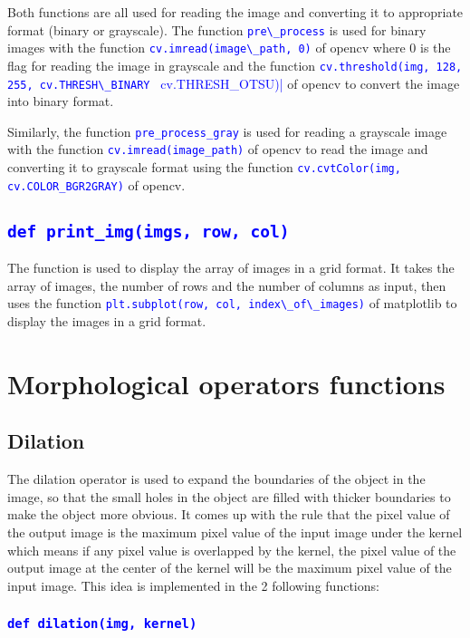 \documentclass{report}
\begin{document}
Both functions are all used for reading the image and converting it to appropriate format (binary or grayscale). The function \textcolor{blue}{\lstinline|pre\_process|} is used for binary images with the function \textcolor{blue}{\lstinline|cv.imread(image\_path, 0)|} of opencv where 0 is the flag for reading the image in grayscale and the function \textcolor{blue}{\lstinline|cv.threshold(img, 128, 255, cv.THRESH\_BINARY | cv.THRESH\_OTSU)|} of opencv to convert the image into binary format.

Similarly, the function \textcolor{blue}{\lstinline|pre_process_gray|} is used for reading a grayscale image with the function \textcolor{blue}{\lstinline|cv.imread(image_path)|} of opencv to read the image and converting it to grayscale format using the function \textcolor{blue}{\lstinline|cv.cvtColor(img, cv.COLOR_BGR2GRAY)|} of opencv.

\subsection*{\textcolor{blue}{\lstinline|def print_img(imgs, row, col)|}}
The function is used to display the array of images in a grid format. It takes the array of images, the number of rows and the number of columns as input, then uses the function \textcolor{blue}{\lstinline|plt.subplot(row, col, index\_of\_images)|} of matplotlib to display the images in a grid format.

\pagebreak
\section{Morphological operators functions}
\subsection{Dilation}
The dilation operator is used to expand the boundaries of the object in the image, so that the small holes in the object are filled with thicker boundaries to make the object more obvious. It comes up with the rule that the pixel value of the output image is the maximum pixel value of the input image under the kernel which means if any pixel value is overlapped by the kernel, the pixel value of the output image at the center of the kernel will be the maximum pixel value of the input image. This idea is implemented in the 2 following functions:

\subsubsection*{\textcolor{blue}{\lstinline|def dilation(img, kernel)|}}
\end{document}
